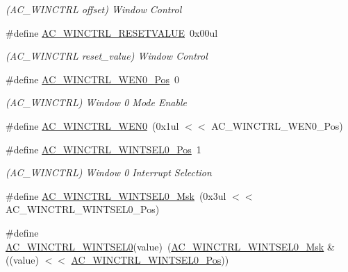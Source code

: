 \begin{DoxyCompactItemize}
\begin{DoxyCompactList}\small\item\em (A\+C\+\_\+\+W\+I\+N\+C\+T\+RL offset) Window Control \end{DoxyCompactList}\item 
\#define \mbox{\hyperlink{group___s_a_m_d21___a_c_gaef191946603b0aebaf28aebcc5331ce8}{A\+C\+\_\+\+W\+I\+N\+C\+T\+R\+L\+\_\+\+R\+E\+S\+E\+T\+V\+A\+L\+UE}}~0x00ul
\begin{DoxyCompactList}\small\item\em (A\+C\+\_\+\+W\+I\+N\+C\+T\+RL reset\+\_\+value) Window Control \end{DoxyCompactList}\item 
\#define \mbox{\hyperlink{group___s_a_m_d21___a_c_gab5ded8b8be62ba307c7df588787f6754}{A\+C\+\_\+\+W\+I\+N\+C\+T\+R\+L\+\_\+\+W\+E\+N0\+\_\+\+Pos}}~0
\begin{DoxyCompactList}\small\item\em (A\+C\+\_\+\+W\+I\+N\+C\+T\+RL) Window 0 Mode Enable \end{DoxyCompactList}\item 
\#define \mbox{\hyperlink{group___s_a_m_d21___a_c_gae23d36c4d876b6ca53cb1743c9645c98}{A\+C\+\_\+\+W\+I\+N\+C\+T\+R\+L\+\_\+\+W\+E\+N0}}~(0x1ul $<$$<$ A\+C\+\_\+\+W\+I\+N\+C\+T\+R\+L\+\_\+\+W\+E\+N0\+\_\+\+Pos)
\item 
\#define \mbox{\hyperlink{group___s_a_m_d21___a_c_gaf7bc05aa7122fff6ea05ae690cbc8486}{A\+C\+\_\+\+W\+I\+N\+C\+T\+R\+L\+\_\+\+W\+I\+N\+T\+S\+E\+L0\+\_\+\+Pos}}~1
\begin{DoxyCompactList}\small\item\em (A\+C\+\_\+\+W\+I\+N\+C\+T\+RL) Window 0 Interrupt Selection \end{DoxyCompactList}\item 
\#define \mbox{\hyperlink{group___s_a_m_d21___a_c_ga71dbb9c9f7b7381eebe22593044610c8}{A\+C\+\_\+\+W\+I\+N\+C\+T\+R\+L\+\_\+\+W\+I\+N\+T\+S\+E\+L0\+\_\+\+Msk}}~(0x3ul $<$$<$ A\+C\+\_\+\+W\+I\+N\+C\+T\+R\+L\+\_\+\+W\+I\+N\+T\+S\+E\+L0\+\_\+\+Pos)
\item 
\#define \mbox{\hyperlink{group___s_a_m_d21___a_c_gaf46f3e5bd573d5b57dec6bd90df52da8}{A\+C\+\_\+\+W\+I\+N\+C\+T\+R\+L\+\_\+\+W\+I\+N\+T\+S\+E\+L0}}(value)~(\mbox{\hyperlink{group___s_a_m_d21___a_c_ga71dbb9c9f7b7381eebe22593044610c8}{A\+C\+\_\+\+W\+I\+N\+C\+T\+R\+L\+\_\+\+W\+I\+N\+T\+S\+E\+L0\+\_\+\+Msk}} \& ((value) $<$$<$ \mbox{\hyperlink{group___s_a_m_d21___a_c_gaf7bc05aa7122fff6ea05ae690cbc8486}{A\+C\+\_\+\+W\+I\+N\+C\+T\+R\+L\+\_\+\+W\+I\+N\+T\+S\+E\+L0\+\_\+\+Pos}}))
$$
\end{DoxyCompactItemize}
